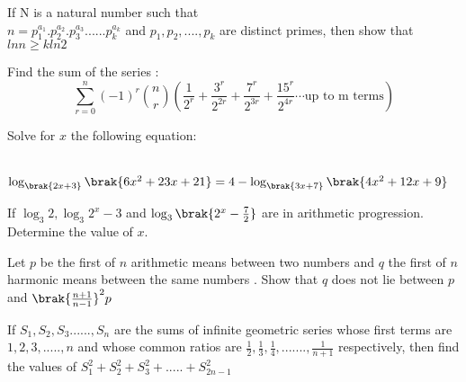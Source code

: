 \iffalse
  \title{Assignment-1}
  \author{EE24BTECH11016 - DHWANITH M DODDAHUNDI}
  \section{subjective}
\fi
    \item If N is a natural number such that
\\ 
$n= p_{1}^{a_1}.p_{2}^{a_2}.p_{3}^{a_3}......p_{k}^{a_k} $ and $ p_{1},p_{2},....,p_{k} $ are distinct primes, then show that $ ln n \geq k ln2 $                              
     
		\hfill {}              


	\item Find the sum of the series : \\   \[
\sum_{r=0}^{n} (-1)^r \binom{n}{r} \left( \frac{1}{2^r} + \frac{3^r}{2^{2r}} + \frac{7^r}{2^{3r}} + \frac{15^r}{2^{4r}}  \cdots \text{up to m terms} \right)
\]



	    
	    
	    \hfill {}
	    
     \item Solve for $x$ the following equation:     
     
	     \hfill {}          \\              
		     $   \log_{\brak{2x+3}}{\brak{6x^{2}+23x+21}}=4-\log_{\brak{3x+7}}{\brak{4x^{2}+12x+9}} $

	     \item If $ \log_{3}{2},\log_{3}{2^{x}-3} $ and $ \log_{3}{\brak{2^{x}-\frac{7}{2}}} $ are in arithmetic progression. Determine the value of $x$.  
     
	      \hfill {}
      

      \item Let $p$ be the first of $n$ arithmetic means between two numbers and $q$ the first of $n$ harmonic means between the same numbers . Show that $q$ does not lie between $p$ and $\brak{\frac{n+1}{n-1}}^{2}p$ 
       
	      \hfill {}
      

      \item  If $ S_1,S_2,S_3......,S_n $ are the sums of infinite geometric series whose first terms are $1,2,3,.....,n$ and whose common ratios are $ \frac{1}{2},\frac{1}{3},\frac{1}{4},.......,\frac{1}{n+1} $ respectively, then find the values of $ S_{1}^{2}+S_{2}^{2}+S_{3}^{2}+.....+S_{2n-1}^{2} $
      
